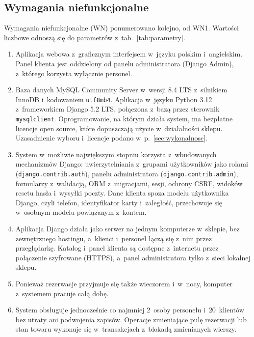 \documentclass[12pt,a4paper,oneside]{article}
\newcounter{pu}
\begin{document}
\subsection{Wymagania niefunkcjonalne}
\label{sec:wn}

Wymagania niefunkcjonalne (WN) ponumerowano kolejno, od WN1. Wartości liczbowe odnoszą się do parametrów z~tab.~\ref{tab:parametry}.

\begin{enumerate}[label=WN\arabic*.,ref=WN\arabic*,leftmargin=1.6cm]
	\item Aplikacja webowa z~graficznym interfejsem w~języku polskim i~angielskim. Panel klienta jest oddzielony od panelu administratora (Django Admin), z~którego korzysta wyłącznie personel.
	\item Baza danych MySQL Community Server w~wersji 8.4 LTS z~silnikiem InnoDB i~kodowaniem \texttt{utf8mb4}. Aplikacja w~języku Python 3.12 z~frameworkiem Django 5.2 LTS, połączona z~bazą przez sterownik \texttt{mysqlclient}. Oprogramowanie, na którym działa system, ma bezpłatne licencje open source, które dopuszczają użycie w~działalności sklepu. Uzasadnienie wyboru i~licencje podano w~p.~\ref{sec:wykonalnosc}.
	\item \label{wn:django} System w~możliwie największym stopniu korzysta z~wbudowanych mechanizmów Django: uwierzytelniania z~grupami użytkowników jako rolami (\texttt{django.\allowbreak contrib.\allowbreak auth}), panelu administratora (\texttt{django.\allowbreak contrib.\allowbreak admin}), formularzy z~walidacją, ORM z~migracjami, sesji, ochrony CSRF, widoków resetu hasła i~wysyłki poczty. Dane klienta spoza modelu użytkownika Django, czyli telefon, identyfikator karty i~zaległość, przechowuje się w~osobnym modelu powiązanym z~kontem.
	\item \label{wn:wdrozenie} Aplikacja Django działa jako serwer na jednym komputerze w~sklepie, bez zewnętrznego hostingu, a~klienci i~personel łączą się z~nim przez przeglądarkę. Katalog i~panel klienta są dostępne z~internetu przez połączenie szyfrowane (HTTPS), a~panel administratora tylko z~sieci lokalnej sklepu.
	\item Ponieważ rezerwacje przyjmuje się także wieczorem i~w~nocy, komputer z~systemem pracuje całą dobę.
	\item \label{wn:wspolbieznosc} System obsługuje jednocześnie co najmniej 2~osoby personelu i~20~klientów bez utraty ani podwojenia zapisów. Operacje zmieniające pulę rezerwacji lub stan towaru wykonuje się w~transakcjach z~blokadą zmienianych wierszy.

\end{enumerate}
\end{document}
